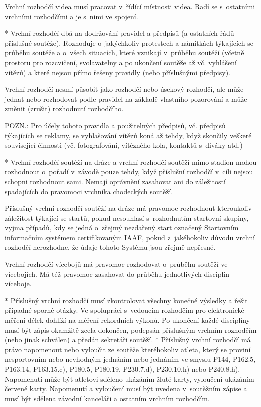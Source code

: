 Vrchní rozhodčí videa musí pracovat v~řídící místnosti videa. Radí se s~ostatními vrchními rozhodčími a je s~nimi ve spojení.

* Vrchní rozhodčí dbá na dodržování pravidel a předpisů (a ostatních řádů příslušné soutěže). Rozhoduje o~jakýchkoliv protestech a námitkách týkajících se průběhu soutěže a o~všech situacích, které vznikají v~průběhu soutěží (včetně prostoru pro rozcvičení, svolavatelny a po ukončení soutěže až vč. vyhlášení vítězů) a které nejsou přímo řešeny pravidly (nebo příslušnými předpisy).

Vrchní rozhodčí nesmí působit jako rozhodčí nebo úsekový rozhodčí, ale může jednat nebo rozhodovat podle pravidel na základě vlastního pozorování a může změnit (zrušit)  rozhodnutí rozhodčího.

POZN.: Pro účely tohoto pravidla a použitelných předpisů, vč. předpisů týkajících se reklamy, se vyhlašování vítězů koná až tehdy, když skončily veškeré související činnosti (vč. fotografování, vítězného kola, kontaktů s~diváky atd.)

* Vrchní rozhodčí soutěží na dráze a vrchní rozhodčí soutěží mimo stadion mohou rozhodnout o~pořadí v~závodě pouze tehdy, když příslušní rozhodčí v~cíli nejsou schopni rozhodnout sami. Nemají oprávnění zasahovat ani do záležitostí spadajících do pravomoci vrchníka chodeckých soutěží.

Příslušný vrchní rozhodčí soutěží na dráze má pravomoc rozhodnout kteroukoliv záležitost týkající se startů, pokud nesouhlasí s~rozhodnutím startovní skupiny, vyjma případů, kdy se jedná o~zřejmý nezdařený start označený Startovním informačním systémem certifikovaným IAAF, pokud z~jakéhokoliv důvodu vrchní rozhodčí nerozhodne, že údaje tohoto Systému jsou zřejmě nepřesné.

Vrchní rozhodčí vícebojů má pravomoc rozhodovat o~průběhu soutěží ve vícebojích. Má též pravomoc zasahovat do průběhu jednotlivých disciplín víceboje.

* Příslušný vrchní rozhodčí musí zkontrolovat všechny konečné výsledky a řešit případné sporné otázky. Ve spolupráci s~vedoucím rozhodčím pro elektronické měření délek dohlíží na měření rekordních výkonů. Po ukončení každé disciplíny musí být zápis okamžitě zcela dokončen, podepsán příslušným vrchním rozhodčím (nebo jinak schválen) a předán sekretáři soutěží.
* Příslušný vrchní rozhodčí má právo napomenout nebo vyloučit ze soutěže kteréhokoliv atleta, který se proviní nesportovním nebo nevhodným jednáním nebo jednáním ve smyslu P144, P162.5, P163.14, P163.15.c), P180.5, P180.19, P230.7.d), P230.10.h) nebo P240.8.h). Napomenutí může být atletovi sděleno ukázáním žluté karty, vyloučení ukázáním červené karty. Napomenutí a vyloučení musí být uvedena v~soutěžním zápise a musí být sdělena závodní kanceláři a ostatním vrchním rozhodčím.

